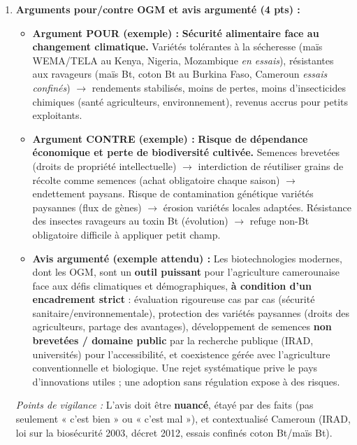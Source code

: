 \documentclass[11pt]{article}
\begin{document}
\begin{corrige}
\begin{enumerate}
\item \textbf{Arguments pour/contre OGM et avis argumenté (4 pts) :}
\begin{itemize}
\item \textbf{Argument POUR (exemple) :} \textbf{Sécurité alimentaire face au changement climatique.} Variétés tolérantes à la sécheresse (maïs WEMA/TELA au Kenya, Nigeria, Mozambique \emph{en essais}), résistantes aux ravageurs (maïs Bt, coton Bt au Burkina Faso, Cameroun \emph{essais confinés}) $\rightarrow$ rendements stabilisés, moins de pertes, moins d'insecticides chimiques (santé agriculteurs, environnement), revenus accrus pour petits exploitants.
\item \textbf{Argument CONTRE (exemple) :} \textbf{Risque de dépendance économique et perte de biodiversité cultivée.} Semences brevetées (droits de propriété intellectuelle) $\rightarrow$ interdiction de réutiliser grains de récolte comme semences (achat obligatoire chaque saison) $\rightarrow$ endettement paysans. Risque de contamination génétique variétés paysannes (flux de gènes) $\rightarrow$ érosion variétés locales adaptées. Résistance des insectes ravageurs au toxin Bt (évolution) $\rightarrow$ refuge non-Bt obligatoire difficile à appliquer petit champ.
\item \textbf{Avis argumenté (exemple attendu) :} \og Les biotechnologies modernes, dont les OGM, sont un \textbf{outil puissant} pour l'agriculture camerounaise face aux défis climatiques et démographiques, \textbf{à condition d'un encadrement strict} : évaluation rigoureuse cas par cas (sécurité sanitaire/environnementale), protection des variétés paysannes (droits des agriculteurs, partage des avantages), développement de semences \textbf{non brevetées / domaine public} par la recherche publique (IRAD, universités) pour l'accessibilité, et coexistence gérée avec l'agriculture conventionnelle et biologique. Une rejet systématique prive le pays d'innovations utiles ; une adoption sans régulation expose à des risques. \fg{}
\end{itemize}
\textit{Points de vigilance :} L'avis doit être \textbf{nuancé}, étayé par des faits (pas seulement « c'est bien » ou « c'est mal »), et contextualisé Cameroun (IRAD, loi sur la biosécurité 2003, décret 2012, essais confinés coton Bt/maïs Bt).
\end{enumerate}
\end{corrige}
\end{document}

